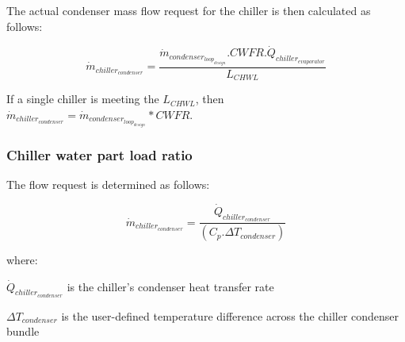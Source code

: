 The actual condenser mass flow request for the chiller is then calculated as follows:

\begin{equation}
{\dot m_{chiller_{condenser}}} = \frac{{\dot m_{condenser_{loop_{design}}}} . {CWFR} . {\dot Q_{chiller_{evaporator}}}}{L_{CHWL}}
\end{equation}

If a single chiller is meeting the \({L_{CHWL}}\), then \({\dot m_{chiller_{condenser}}} = {\dot m_{condenser_{loop_{design}}}} * {CWFR}\).

\subsubsection{Chiller water part load ratio}

The flow request is determined as follows:

\begin{equation}
{\dot m_{chiller_{condenser}}} = \frac{{\dot Q_{chiller_{condenser}}}}{({C_p} . {\Delta {T_{condenser}}})}
\end{equation}

where:

\({\dot Q_{chiller_{condenser}}}\) is the chiller's condenser heat transfer rate

\({\Delta {T_{condenser}}}\) is the user-defined temperature difference across the chiller condenser bundle
